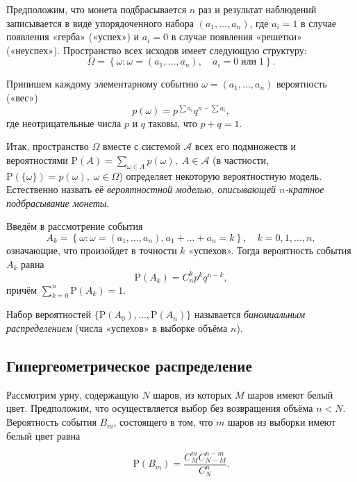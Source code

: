 \documentclass[11pt,a4paper]{article}
\begin{document}
Предположим, что монета подбрасывается \(n\) раз и результат наблюдений
записывается в виде упорядоченного набора \((a_1, \ldots, a_n)\), где
\(a_i = 1\) в случае появления «герба» («успех») и \(a_i = 0\) в случае
появления «решетки» («неуспех»). Пространство всех исходов имеет
следующую структуру:
\[ \Omega= \left\{ \omega: \omega = (a_1, \ldots, a_n), \quad a_i = 0 \; \mathrm{или} \; 1 \right\}. \]

Припишем каждому элементарному событию \(\omega = (a_1, \ldots, a_n)\)
вероятность («вес») \[ p(\omega) = p^{\sum a_i} q^{n-\sum a_i}, \] где
неотрицательные числа \(p\) и \(q\) таковы, что \(p + q = 1\).

Итак, пространство \(\Omega\) вместе с системой \(\mathcal{A}\) всех его
подмножеств и вероятностями
\(\mathrm{P}(A) = \sum\limits_{\omega \in A}p(\omega), \; A \in \mathcal{A}\)
(в частности,
\(\mathrm{P}(\{\omega\}) = p(\omega), \; \omega \in \Omega\)) определяет
некоторую вероятностную модель. Естественно назвать её
\emph{вероятностной моделью, описывающей \(n\)-кратное подбрасывание
монеты}.

Введём в рассмотрение события \[ 
    A_k = \left\{\omega: \omega=(a_1, \ldots, a_n), a_1 + \ldots + a_n = k\right\}, \quad k = 0, 1, \ldots, n,
\] означающие, что произойдет в точности \(k\) «успехов». Тогда
вероятность события \(A_k\) равна
\[ \mathrm{P}(A_k) = C_n^k p^k q^{n-k}, \] причём
\(\sum\limits_{k=0}^n \mathrm{P}(A_k) = 1\).

Набор вероятностей \(\{\mathrm{P}(A_0), \ldots,\mathrm{P}(A_n)\}\)
называется \emph{биномиальным распределением} (числа «успехов» в выборке
объёма \(n\)).

    \hypertarget{ux433ux438ux43fux435ux440ux433ux435ux43eux43cux435ux442ux440ux438ux447ux435ux441ux43aux43eux435-ux440ux430ux441ux43fux440ux435ux434ux435ux43bux435ux43dux438ux435}{%
\subsection{Гипергеометрическое
распределение}\label{ux433ux438ux43fux435ux440ux433ux435ux43eux43cux435ux442ux440ux438ux447ux435ux441ux43aux43eux435-ux440ux430ux441ux43fux440ux435ux434ux435ux43bux435ux43dux438ux435}}

Рассмотрим урну, содержащую \(N\) шаров, из которых \(M\) шаров имеют
белый цвет. Предположим, что осуществляется выбор без возвращения объёма
\(n < N\). Вероятность события \(B_m\), состоящего в том, что \(m\)
шаров из выборки имеют белый цвет равна

\[ \mathrm{P}(B_m) = \dfrac{C_M^m C_{N-M}^{n-m}}{C_N^n}. \]
\end{document}
